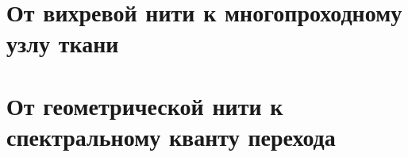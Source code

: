 \documentclass[12pt,a4paper]{report}
\theoremstyle{remark}
\begin{document}
\part{От вихревой нити к многопроходному узлу ткани}










\part{От геометрической нити к спектральному кванту перехода}
\end{document}
